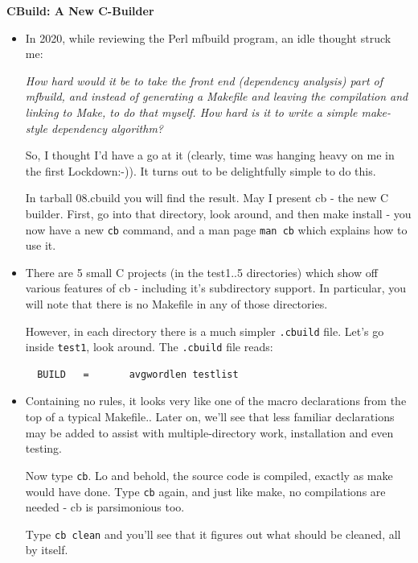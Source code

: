 \documentclass[handout]{beamer}
\newcommand\myheading[1]{%
  \par\bigskip
  {\Large\bfseries#1}\par\smallskip}
\begin{document}
\begin{frame}[fragile]

  \myheading{CBuild: A New C-Builder}

    \begin{itemize}
      \item
      In 2020, while reviewing the Perl mfbuild program, an idle thought struck me:

    \pitem
      {\em How hard would it be to take the front end (dependency analysis)
      part of mfbuild, and instead of generating a Makefile and leaving
      the compilation and linking to Make, to do that myself.  How hard is
      it to write a simple make-style dependency algorithm?}

     \pitem
       So, I thought I'd have a go at it (clearly, time was hanging heavy on me
       in the first Lockdown:-)).  It turns out to be delightfully simple to
       do this.

      \pitem
      In \alert{tarball 08.cbuild} you will find the result.  May I present
      \alert{cb} - the new C builder.  
      First, go into that directory, look around,
      and then \alert{make install} - you now have a new \verb+cb+ command,
      and a man page \verb+man cb+ which explains how to use it.

    \end{itemize}

\end{frame}


\begin{frame}[fragile]
  \begin{itemize}

  \item
  There are 5 small C projects (in the test1..5 directories) which show off
  various features of \alert{cb} - including it's subdirectory support.  In
  particular, you will note that there is \alert{no Makefile} in any of
  those directories.

  \pitem
  However, in each directory there is a much simpler \verb+.cbuild+ file.
  Let's go inside \verb+test1+, look around. The \verb+.cbuild+ file reads:

\tiny
\begin{verbatim}
  BUILD   =       avgwordlen testlist
\end{verbatim}
\small

  \item
  Containing no rules, it looks very like one of the macro declarations
  from the top of a typical Makefile..
  \pause
  Later on, we'll see that less familiar declarations may be added to
  assist with multiple-directory work, installation and even testing.

  \pitem
  Now type \verb+cb+.  Lo and behold, the source code is compiled,
  exactly as make would have done.  
  Type \verb+cb+ again, and just like make, no compilations are needed -
  \alert{cb} is parsimonious too.

  \pitem
  Type \verb+cb clean+ and you'll see that it figures out what should be
  cleaned, all by itself.

  \end{itemize}
\end{frame}
\end{document}
